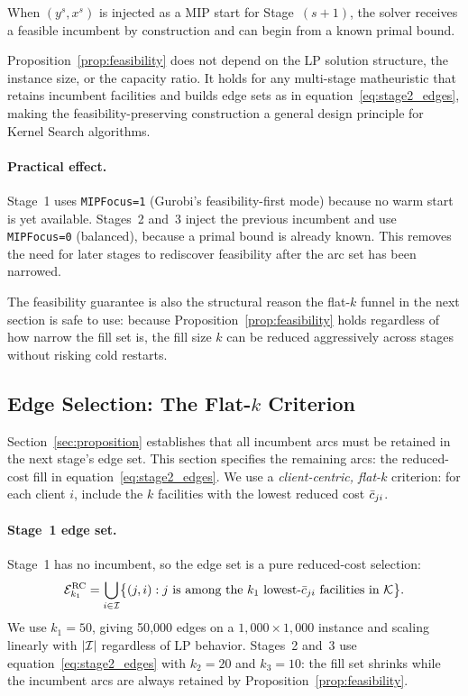 \begin{corollary}
\label{cor:warmstart}
When $(y^s, x^s)$ is injected as a MIP start for Stage~$(s{+}1)$, the
solver receives a feasible incumbent by construction and can begin from a
known primal bound.
\end{corollary}

\begin{remark}
Proposition~\ref{prop:feasibility} does not depend on the LP solution
structure, the instance size, or the capacity ratio.
It holds for any multi-stage matheuristic that retains incumbent facilities
and builds edge sets as in equation~\eqref{eq:stage2_edges}, making the
feasibility-preserving construction a general design principle for
Kernel Search algorithms.
\end{remark}

\paragraph{Practical effect.}
Stage~1 uses \texttt{MIPFocus=1} (Gurobi's feasibility-first mode) because
no warm start is yet available.
Stages~2 and~3 inject the previous incumbent and use \texttt{MIPFocus=0}
(balanced), because a primal bound is already known.
This removes the need for later stages to rediscover feasibility after the
arc set has been narrowed.

The feasibility guarantee is also the structural reason the flat-$k$ funnel
in the next section is safe to use: because Proposition~\ref{prop:feasibility}
holds regardless of how narrow the fill set is, the fill size $k$ can be
reduced aggressively across stages without risking cold restarts.

\subsection{Edge Selection: The \texorpdfstring{Flat-$k$}{Flat-k} Criterion}
\label{sec:edge_selection}

Section~\ref{sec:proposition} establishes that all incumbent arcs must be
retained in the next stage's edge set.
This section specifies the remaining arcs: the reduced-cost fill in
equation~\eqref{eq:stage2_edges}.
We use a \emph{client-centric, flat-$k$} criterion: for each client $i$,
include the $k$ facilities with the lowest reduced cost $\bar{c}_{ji}$.

\paragraph{Stage~1 edge set.}
Stage~1 has no incumbent, so the edge set is a pure reduced-cost selection:
\begin{equation}
  \mathcal{E}^{\text{RC}}_{k_1}
  = \bigcup_{i \in \mathcal{I}}
    \bigl\{ (j, i) : j \text{ is among the } k_1 \text{ lowest-}\bar{c}_{ji}
    \text{ facilities in } \mathcal{K} \bigr\}.
  \label{eq:stage1_edges}
\end{equation}
We use $k_1 = 50$, giving 50{,}000 edges on a $1{,}000 \times 1{,}000$
instance and scaling linearly with $|\mathcal{I}|$ regardless of LP behavior.
Stages~2 and~3 use equation~\eqref{eq:stage2_edges} with $k_2=20$ and
$k_3=10$: the fill set shrinks while the incumbent arcs are always retained
by Proposition~\ref{prop:feasibility}.

